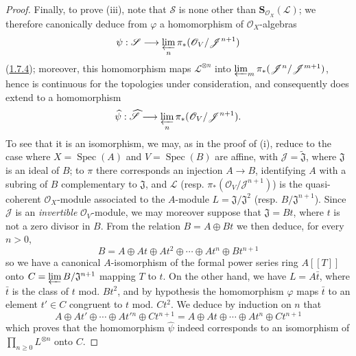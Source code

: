 \begin{proof}
Finally, to prove (iii), note that $\mathcal{S}$ is none other than
$\mathbf{S}_{\mathcal{O}_X}(\mathcal{L})$; we therefore canonically deduce
from $\varphi$ a homomorphism of $\mathcal{O}_X$-algebras
\[
  \psi:\mathcal{S}\longrightarrow
  \varprojlim_n\pi_*(\mathcal{O}_V/\mathcal{J}^{n+1})
\]
(\hyperref[II.1.7.4]{1.7.4}); moreover, this homomorphism maps
$\mathcal{L}^{\otimes n}$ into
$\varprojlim_m\pi_*(\mathcal{J}^n/\mathcal{J}^{m+1})$, hence is continuous for
the topologies under consideration, and consequently does extend to a
homomorphism
\[
  \widehat{\psi}:\widehat{\mathcal{S}}\longrightarrow
  \varprojlim_n\pi_*(\mathcal{O}_V/\mathcal{J}^{n+1}).
\]
To see that it is an isomorphism, we may, as in the proof of (i), reduce to
the case where $X=\operatorname{Spec}(A)$ and
$V=\operatorname{Spec}(B)$ are affine, with
$\mathcal{J}=\widetilde{\mathfrak{J}}$, where $\mathfrak{J}$ is an ideal of
$B$; to $\pi$ there corresponds an injection $A\to B$, identifying $A$ with a
subring of $B$ complementary to $\mathfrak{J}$, and $\mathcal{L}$ (resp.
$\pi_*(\mathcal{O}_V/\mathcal{J}^{n+1})$) is the quasi-coherent
$\mathcal{O}_X$-module associated to the $A$-module
$L=\mathfrak{J}/\mathfrak{J}^2$ (resp. $B/\mathfrak{J}^{n+1}$). Since
$\mathcal{J}$ is an \emph{invertible} $\mathcal{O}_V$-module, we may
moreover suppose that $\mathfrak{J}=Bt$, where $t$ is not a zero divisor in
$B$. From the relation $B=A\oplus Bt$ we then deduce, for every $n>0$,
\[
  B=A\oplus At\oplus At^2\oplus\cdots\oplus At^n\oplus Bt^{n+1}
\]
so we have a canonical $A$-isomorphism of the formal power series ring
$A[[T]]$ onto $C=\varprojlim B/\mathfrak{J}^{n+1}$ mapping $T$ to $t$. On
the other hand, we have $L=A\bar t$, where $\bar t$ is the class of $t$
mod. $Bt^2$, and by hypothesis the homomorphism $\varphi$ maps $\bar t$ to an
element $t'\in C$ congruent to $t$ mod. $Ct^2$. We deduce by induction
on $n$ that
\[
  A\oplus At'\oplus\cdots\oplus At'{}^n\oplus Ct^{n+1}
  =A\oplus At\oplus\cdots\oplus At^n\oplus Ct^{n+1}
\]
which proves that the homomorphism $\widehat{\psi}$ indeed corresponds to an
isomorphism of $\prod_{n\geqslant0}L^{\otimes n}$ onto $C$.
\end{proof}


